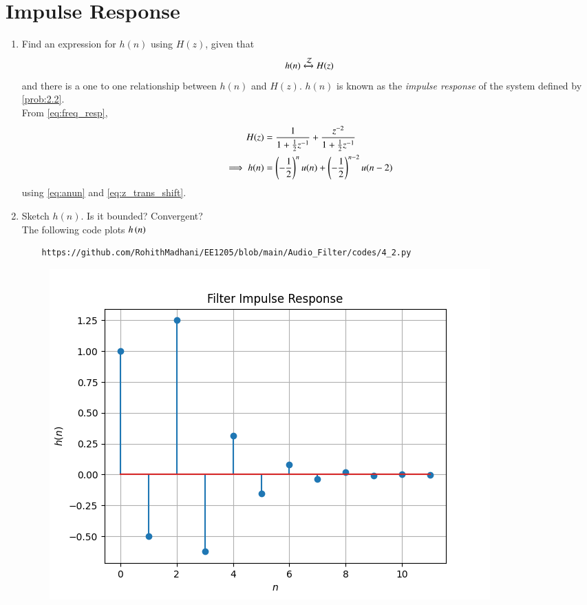 \documentclass[journal,12pt,twocolumn]{IEEEtran}
\theoremstyle{remark}
\begin{document}
\section{Impulse Response}
\begin{enumerate}[label=\thesection.\arabic*]
\item \label{prob:impulse_resp}
Find an expression for $h(n)$ using $H(z)$, given that 
\begin{equation}
\label{eq:impulse_resp}
h(n) \xleftrightarrow{\mathcal{Z}} H(z)
\end{equation}
and there is a one to one relationship between $h(n)$ and $H(z)$. $h(n)$ is known as the {\em impulse response} of the
system defined by \eqref{prob:2.2}.
\\
\solution From \eqref{eq:freq_resp},
\begin{align}
H(z) &= \frac{1}{1 + \frac{1}{2}z^{-1}} + \frac{ z^{-2}}{1 + \frac{1}{2}z^{-1}}
\\
\implies h(n) &= \left(-\frac{1}{2}\right)^{n}u(n) + \left(-\frac{1}{2}\right)^{n-2}u(n-2)
\end{align}
using \eqref{eq:anun} and \eqref{eq:z_trans_shift}.
\item Sketch $h(n)$. Is it bounded? Convergent? 
\\
\solution The following code plots $h\left(n\right)$ 
\begin{lstlisting}
    https://github.com/RohithMadhani/EE1205/blob/main/Audio_Filter/codes/4_2.py
\end{lstlisting}
\begin{figure}[H]
\centering
\includegraphics[width=\columnwidth]{figs/4_2.png}

\end{figure}
\end{enumerate}
\end{document}
